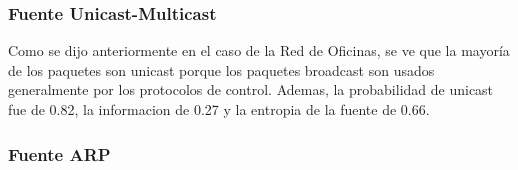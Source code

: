 \subsubsection{Fuente Unicast-Multicast}

\begin{figure}
	\begin{minipage}[b]{0.9\linewidth}
	\end{minipage}
\end{figure}

Como se dijo anteriormente en el caso de la Red de Oficinas, se ve que la mayor\'ia
de los paquetes son unicast porque los paquetes broadcast son usados generalmente
por los protocolos de control. Ademas, la probabilidad de unicast fue de 0.82, la
informacion de 0.27 y la entropia de la fuente de 0.66.

\subsubsection{Fuente ARP}


